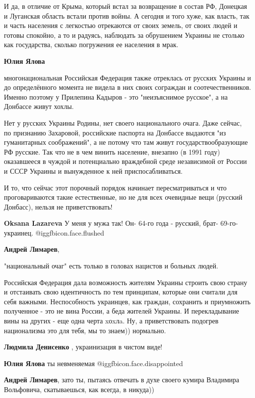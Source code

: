 \begin{itemize}
\begin{itemize}
И да, в отличие от Крыма, который встал за возвращение в состав РФ, Донецкая и
Луганская область встали против войны. А сегодня и того хуже, как власть, так и
часть населения с легкостью отрекаются от своих земель, от своих людей и готовы
спокойно, а то и радуясь, наблюдать за обрушением Украины не столько как
государства, сколько погружения ее населения в мрак.

\textbf{Юлия Ялова} 

многонациональная Российская Федерация также отреклась от русских Украины и до
определённого момента не видела в них своих сограждан и соотечественников.
Именно поэтому у Прилепина Кадыров - это "неизъяснимое русское", а на Донбассе
живут хохлы.

Нет у русских Украины Родины, нет своего национального очага. Даже сейчас, по
признанию Захаровой, российские паспорта на Донбассе выдаются "из гуманитарных
соображений", а не потому что там живут государствообразующие РФ русские. Так
что не в чем винить население, внезапно (в 1991 году) оказавшееся в чуждой и
потенциально враждебной среде независимой от России и СССР Украины и
вынужденное к ней приспосабливаться.

И то, что сейчас этот порочный порядок начинает пересматриваться и что
проговариваются такие естественные, но не для всех очевидные вещи (русский
Донбасс), нельзя не приветствовать!


\textbf{Oksana Lazareva} У меня у мужа так! Он- 64-го года - русский, брат- 69-го- украинец.  @igg{fbicon.face.flushed} 

\textbf{Андрей Лимарев}, 

"национальный очаг" есть только в головах нацистов и больных людей.

Российская Федерация дала возможность жителям Украины строить свою страну и
отстаивать свою идентичность по тем принципам, которые они считали для себя
важными. Неспособность украинцев, как граждан, сохранить и приумножить
полученное - это не вина России, а беда жителей Украины. И перекладывание вины
на других - еще одна черта xоxлa. Ну, а приветствовать подогрев национализма
это для тебя, мы то знаем)) нормально.


\textbf{Людмила Денисенко} , украинизация в чистом виде!

\textbf{Юлия Ялова} ты невменяемая  @igg{fbicon.face.disappointed} 

\textbf{Андрей Лимарев}, зато ты, пытаясь отвечать в духе своего кумира Владимира Вольфовича, скатываешься, как всегда, в никуда))


\end{itemize}
\end{itemize}
